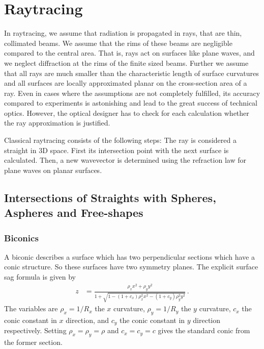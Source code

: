 \documentclass[12pt,a4paper,twoside,openright,BCOR10mm,headsepline,titlepage,abstracton,chapterprefix,final]{scrreprt}
\begin{document}
\chapter{Raytracing}
In raytracing, we assume that radiation is propagated in rays, that are thin, collimated beams. 
We assume that the rims of these beams are negligible compared to the central area. That is, rays act on surfaces like plane waves, and we neglect diffraction at the rims of the finite sized beams.
Further we assume that all rays are much smaller than the characteristic length of surface curvatures and all surfaces are locally approximated planar on the cross-section area of a ray.
Even in cases where the assumptions are not completely fulfilled, its accuracy compared to experiments is astonishing and lead to the great success of technical optics.
However, the optical designer has to check for each calculation whether the ray approximation is justified.

Classical raytracing consists of the following steps: The ray is considered a straight in 3D space. First its intersection point with the next surface is calculated. 
Then, a new wavevector is determined using the refraction law for plane waves on planar surfaces.

\section{Intersections of Straights with Spheres, Aspheres and Free-shapes}\label{subsec:intersectionformulas}

\subsection{Biconics}
A biconic describes a surface which has two perpendicular sections
which have a conic structure. So these surfaces have two symmetry planes.
The explicit surface sag formula is given by
\begin{align}
 z &= \frac{\rho_x x^2 + \rho_y y^2}{1 + \sqrt{1 - (1+c_x) \rho_x^2 x^2 - (1+c_y) \rho_y^2 y^2}} \label{eq:biconic}\,.
\end{align}
The variables are $\rho_x = 1/R_x$ the $x$ curvature, $\rho_y = 1/R_y$ the $y$ curvature, $c_x$ the conic constant in $x$ direction,
and $c_y$ the conic constant in $y$ direction respectively. Setting $\rho_x = \rho_y = \rho$ and $c_x = c_y = c$ gives
the standard conic from the former section.
\end{document}
